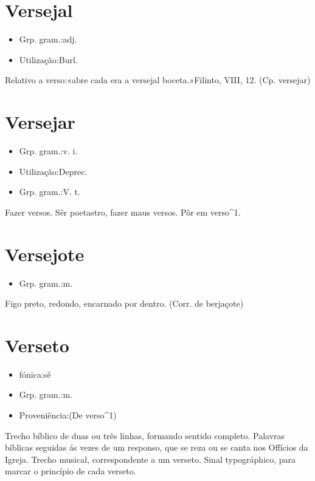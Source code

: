 \documentclass{article}
\begin{document}
\section{Versejal}
\begin{itemize}
\item {Grp. gram.:adj.}
\end{itemize}
\begin{itemize}
\item {Utilização:Burl.}
\end{itemize}
Relativo a verso:«\textunderscore abre cada era a versejal boceta.\textunderscore »Filinto, VIII, 12.
(Cp. \textunderscore versejar\textunderscore )
\section{Versejar}
\begin{itemize}
\item {Grp. gram.:v. i.}
\end{itemize}
\begin{itemize}
\item {Utilização:Deprec.}
\end{itemize}
\begin{itemize}
\item {Grp. gram.:V. t.}
\end{itemize}
Fazer versos.
Sêr poetastro, fazer maus versos.
Pôr em verso^1.
\section{Versejote}
\begin{itemize}
\item {Grp. gram.:m.}
\end{itemize}
Figo preto, redondo, encarnado por dentro.
(Corr. de \textunderscore berjaçote\textunderscore )
\section{Verseto}
\begin{itemize}
\item {fónica:sê}
\end{itemize}
\begin{itemize}
\item {Grp. gram.:m.}
\end{itemize}
\begin{itemize}
\item {Proveniência:(De \textunderscore verso\textunderscore ^1)}
\end{itemize}
Trecho bíblico de duas ou três linhas, formando sentido completo.
Palavras bíblicas seguidas ás vezes de um responso, que se reza ou se canta nos Offícios da Igreja.
Trecho musical, correspondente a um verseto.
Sinal typográphico, para marcar o princípio de cada verseto.
\end{document}
